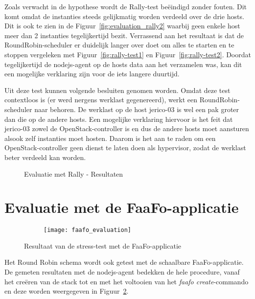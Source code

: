 Zoals verwacht in de hypothese wordt de Rally-test beëindigd zonder fouten. Dit komt omdat de instanties steeds gelijkmatig worden verdeeld over de drie hosts. Dit is ook te zien in de Figuur~\ref{fig:evaluation_rally2} waarbij geen enkele host meer dan 2 instanties tegelijkertijd bezit. Verrassend aan het resultaat is dat de RoundRobin-scheduler er duidelijk langer over doet om alles te starten en te stoppen vergeleken met Figuur~\ref{fig:rally-test1} en Figuur~\ref{fig:rally-test2}. Doordat tegelijkertijd de nodejs-agent op de hosts data aan het verzamelen was, kan dit een mogelijke verklaring zijn voor de iets langere duurtijd.

Uit deze test kunnen volgende besluiten genomen worden. Omdat deze test contextloos is (er werd nergens werklast gegenereerd), werkt een RoundRobin-scheduler naar behoren. De werklast op de host jerico-03 is wel een pak groter dan die op de andere hosts. Een mogelijke verklaring hiervoor is het feit dat jerico-03 zowel de OpenStack-controller is en dus de andere hosts moet aansturen alsook zelf instanties moet hosten. Daarom is het aan te raden om een OpenStack-controller geen dienst te laten doen als hypervisor, zodat de werklast beter verdeeld kan worden.

\begin{figure}
	\centering
	\par\medskip
	\caption{Evaluatie met Rally - Resultaten}
	\label{fig:evaluation_rally}
\end{figure}

\section{Evaluatie met de FaaFo-applicatie}
\begin{figure}
	\centering
	\captionsetup{justification=centering}
	\begin{subfigure}{\textwidth}
		\centering
		\centerline{
			\texttt{[image: faafo\_evaluation]}
		}
	\end{subfigure}
	\caption{Resultaat van de stress-test met de FaaFo-applicatie}
	\label{fig:evaluation_faafo}
\end{figure}

Het Round Robin schema wordt ook getest met de schaalbare FaaFo-applicatie. De gemeten resultaten met de nodejs-agent bedekken de hele procedure, vanaf het creëren van de stack tot en met het voltooien van het \textit{faafo create}-commando en deze worden weergegeven in Figuur~\ref{fig:evaluation_faafo}.

